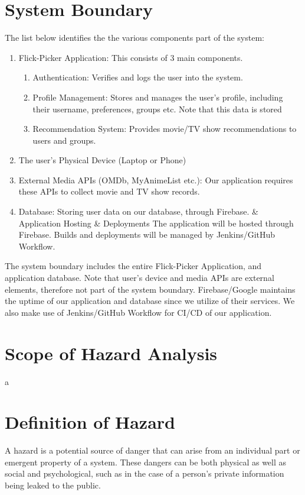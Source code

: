 \documentclass[12pt]{article}
\begin{document}
\section{System Boundary}
The list below identifies the the various components part of the system:
\begin{enumerate}
	\item Flick-Picker Application: This consists of 3 main components.
	\begin{enumerate}
	  \item Authentication: Verifies and logs the user into the system. 
	  \item Profile Management: Stores and manages the user's profile, including their username, preferences, groups etc. Note that this data is stored 
	  \item Recommendation System: Provides movie/TV show recommendations to users and groups.
	\end{enumerate}
	\item The user's Physical Device (Laptop or Phone)
	\item External Media APIs (OMDb, MyAnimeList etc.): Our application requires these APIs to collect movie and TV show records. 
	\item Database: Storing user data on our database, through Firebase. 
	\& Application Hosting \& Deployments The application will be hosted through Firebase. Builds and deployments will be managed by Jenkins/GitHub Workflow.
	\
\end{enumerate}

\noindent The system boundary includes the entire Flick-Picker Application, and application database. Note that user's device and media APIs are external elements, therefore not part of the system boundary. Firebase/Google maintains the uptime of our application and database since we utilize of their services. We also make use of Jenkins/GitHub Workflow for CI/CD of our application. 
	


\section{Scope of Hazard Analysis}
a

\section{Definition of Hazard}
A hazard is a potential source of danger that can arise from an individual part or emergent property of a system. These dangers can be both physical as well as social and psychological, such as in the case of a person's private information being leaked to the public.
\end{document}
